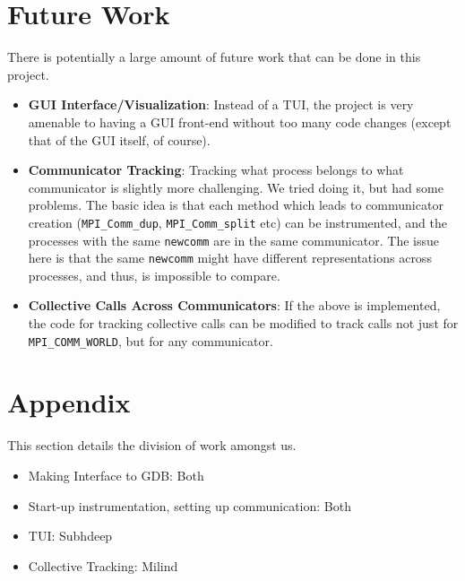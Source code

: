 \documentclass[10pt,conference]{IEEEtran}
\begin{document}
\section{Future Work}

There is potentially a large amount of future work that can be done in this project.

\begin{itemize}
\item \textbf{GUI Interface/Visualization}: Instead of a TUI, the project is very amenable to having a GUI front-end without too many code changes (except that of the GUI itself, of course).
\item \textbf{Communicator Tracking}: Tracking what process belongs to what communicator is slightly more challenging. We tried doing it, but had some problems. The basic idea is that each method which leads to communicator creation (\texttt{MPI\_Comm\_dup}, \texttt{MPI\_Comm\_split} etc) can be instrumented, and the processes with the same \texttt{newcomm} are in the same communicator. The issue here is that the same \texttt{newcomm} might have different representations across processes, and thus, is impossible to compare.
\item \textbf{Collective Calls Across Communicators}: If the above is implemented, the code for tracking collective calls can be modified to track calls not just for \texttt{MPI\_COMM\_WORLD}, but for any communicator.
\end{itemize}

\section{Appendix}

This section details the division of work amongst us.

\begin{itemize}
\item Making Interface to GDB: Both
\item Start-up instrumentation, setting up communication: Both
\item TUI: Subhdeep
\item Collective Tracking: Milind
\end{itemize}



\end{document}
